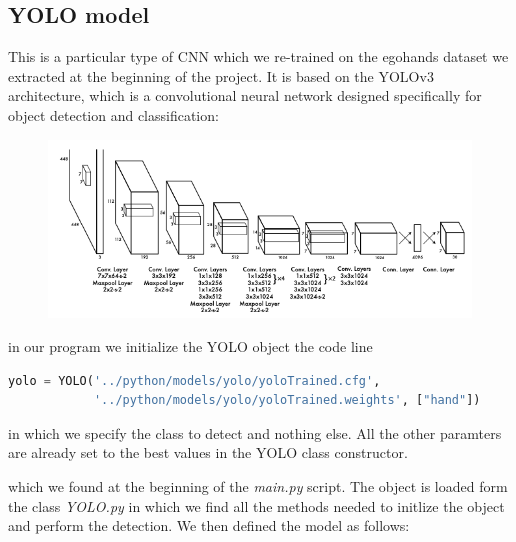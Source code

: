 \subsection{YOLO model}
This is a particular type of CNN which we re-trained on the egohands dataset we extracted at the beginning of the project. It is based on the YOLOv3 architecture, which is a convolutional neural network designed specifically
for object detection and classification:

\begin{figure}[!h]
    \centering
    \includegraphics[scale = 0.5]{images/yolo1_net.png}
\end{figure}

in our program we initialize the YOLO object the code line

\begin{lstlisting}[language=python]
    yolo = YOLO('../python/models/yolo/yoloTrained.cfg',
            '../python/models/yolo/yoloTrained.weights', ["hand"])
\end{lstlisting}
in which we specify the class to detect and nothing else. All the other
paramters are already set to the best values in the
YOLO class constructor.

which we found at the beginning of the \textit{main.py} script. The object is
loaded form the class \textit{YOLO.py}
in which we find all the methods needed to initlize the object and perform the
detection. We then defined the model as follows:

